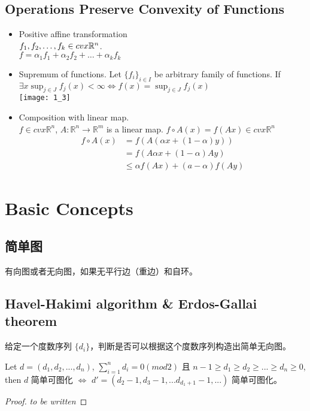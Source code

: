 \documentclass[11pt,fleqn]{book} %
\def\R{\mathbb{R}}
\begin{document}
\begin{CJK}{UTF8}{gkai}
\section{Operations Preserve Convexity of Functions}
\begin{itemize}
\item Positive affine transformation \\
$f_1,f_2,\ldots,f_k \in \space cvx \R^n$.\\
$f = \alpha_1 f_1 + \alpha_2 f_2 + \ldots + \alpha_k f_k$
\item Supremum of functions. Let $\{ f_i \}_{i \in I}$ be arbitrary family of functions. If $\exists x \sup_{j \in J} f_j(x) < \infty \Leftrightarrow f(x) = \sup_{j \in J} f_j(x) $\\
\texttt{[image: 1\_3]}
\item Composition with linear map.\\
$f \in cvx \R^n$, $A:\R^n \to \R^m$ is a linear map.
$f \circ A (x) = f(Ax) \in cvx \R^n$\\
\begin{align*}
f \circ A (x) & = f(A(\alpha x + (1-\alpha) y)) \\
& = f(A \alpha x + (1-\alpha) A y) \\
& \le \alpha f(Ax) + (a - \alpha) f(Ay)
\end{align*}
\end{itemize}

\chapter{Basic Concepts}
\section{简单图}
\begin{definition}
 有向图或者无向图，如果无平行边（重边）和自环。
\end{definition}

\section[short]{Havel-Hakimi algorithm \& Erdos-Gallai theorem}
给定一个度数序列 $\{d_i\}$，判断是否可以根据这个度数序列构造出简单无向图。
\begin{theorem}
     Let $d = (d_1, d_2, ...,d_n)$, $\sum_{i = 1}^n {d_i} = 0 (mod 2)$ 且 $n-1 \geq d_1 \geq 
    d_2 \geq ... \geq d_n \geq 0$, then $d$ 简单可图化 $\iff$ $d' = (d_2 - 1, d_3 - 1, ... d_{d_1 + 1} - 1, ...)$ 简单可图化。 
\end{theorem}
\begin{proof}
    \textit{to be written}
\end{proof}


\end{CJK}
\end{document}
